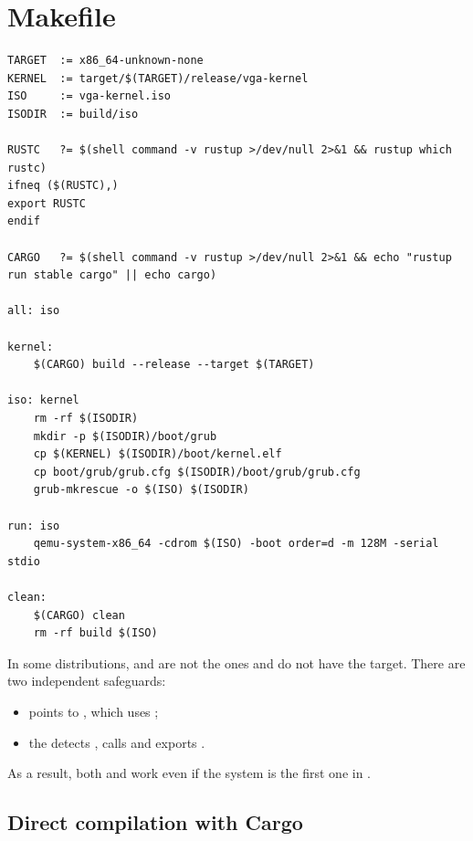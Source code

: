 \section{Makefile}

\begin{lstlisting}[caption={Main targets of the \code{Makefile}.},label={lst:makefile}]
TARGET  := x86_64-unknown-none
KERNEL  := target/$(TARGET)/release/vga-kernel
ISO     := vga-kernel.iso
ISODIR  := build/iso

RUSTC   ?= $(shell command -v rustup >/dev/null 2>&1 && rustup which rustc)
ifneq ($(RUSTC),)
export RUSTC
endif

CARGO   ?= $(shell command -v rustup >/dev/null 2>&1 && echo "rustup run stable cargo" || echo cargo)

all: iso

kernel:
	$(CARGO) build --release --target $(TARGET)

iso: kernel
	rm -rf $(ISODIR)
	mkdir -p $(ISODIR)/boot/grub
	cp $(KERNEL) $(ISODIR)/boot/kernel.elf
	cp boot/grub/grub.cfg $(ISODIR)/boot/grub/grub.cfg
	grub-mkrescue -o $(ISO) $(ISODIR)

run: iso
	qemu-system-x86_64 -cdrom $(ISO) -boot order=d -m 128M -serial stdio

clean:
	$(CARGO) clean
	rm -rf build $(ISO)
\end{lstlisting}

\begin{nota}
In some distributions,  and 
are not the  ones and do not have the
 target. There are two independent safeguards:

\begin{itemize}
  \item {} points  to
        , which uses ;
  \item the  detects , calls
         and exports .
\end{itemize}

As a result, both  and  work even if the system
 is the first one in .
\end{nota}

\subsection{Direct compilation with Cargo}

